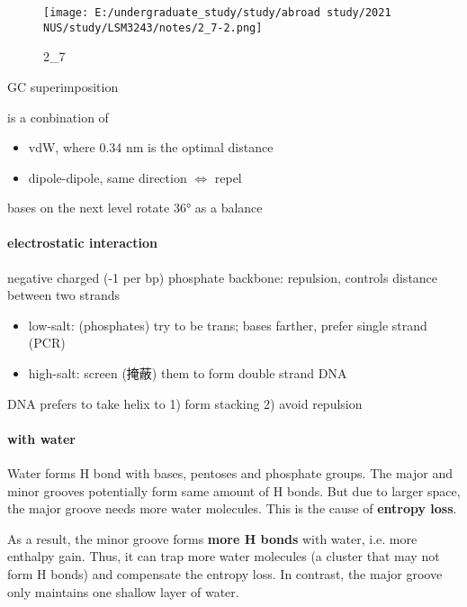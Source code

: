 \documentclass[]{article}
\let\oldparagraph\paragraph
\renewcommand{\paragraph}[1]{\oldparagraph{#1}\mbox{}}
\begin{document}
\begin{figure}
\centering
\texttt{[image: E:/undergraduate\_study/study/abroad study/2021 NUS/study/LSM3243/notes/2\_7-2.png]}
\caption{2\_7}
\end{figure}

GC superimposition

is a conbination of

\begin{itemize}
\item
  vdW, where 0.34 nm is the optimal distance
\item
  dipole-dipole, same direction \(\Leftrightarrow\) repel
\end{itemize}

bases on the next level rotate 36° as a balance

\hypertarget{electrostatic-interaction}{%
\paragraph{electrostatic interaction}\label{electrostatic-interaction}}

negative charged (-1 per bp) phosphate backbone: repulsion, controls
distance between two strands

\begin{itemize}
\item
  low-salt: (phosphates) try to be trans; bases farther, prefer single
  strand (PCR)
\item
  high-salt: screen (掩蔽) them to form double strand DNA
\end{itemize}

DNA prefers to take helix to 1) form stacking 2) avoid repulsion

\hypertarget{with-water}{%
\paragraph{with water}\label{with-water}}

Water forms H bond with bases, pentoses and phosphate groups. The major
and minor grooves potentially form same amount of H bonds. But due to
larger space, the major groove needs more water molecules. This is the
cause of \textbf{entropy loss}.

As a result, the minor groove forms \textbf{more H bonds} with water,
i.e. more enthalpy gain. Thus, it can trap more water molecules (a
cluster that may not form H bonds) and compensate the entropy loss. In
contrast, the major groove only maintains one shallow layer of water.
\end{document}
